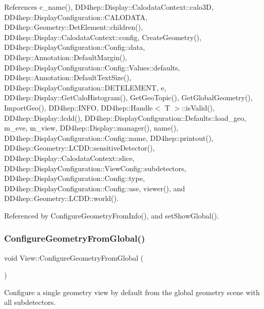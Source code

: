 References c\+\_\+name(), D\+D4hep\+::\+Display\+::\+Calodata\+Context\+::calo3D, D\+D4hep\+::\+Display\+Configuration\+::\+C\+A\+L\+O\+D\+A\+TA, D\+D4hep\+::\+Geometry\+::\+Det\+Element\+::children(), D\+D4hep\+::\+Display\+::\+Calodata\+Context\+::config, Create\+Geometry(), D\+D4hep\+::\+Display\+Configuration\+::\+Config\+::data, D\+D4hep\+::\+Annotation\+::\+Default\+Margin(), D\+D4hep\+::\+Display\+Configuration\+::\+Config\+::\+Values\+::defaults, D\+D4hep\+::\+Annotation\+::\+Default\+Text\+Size(), D\+D4hep\+::\+Display\+Configuration\+::\+D\+E\+T\+E\+L\+E\+M\+E\+NT, e, D\+D4hep\+::\+Display\+::\+Get\+Calo\+Histogram(), Get\+Geo\+Topic(), Get\+Global\+Geometry(), Import\+Geo(), D\+D4hep\+::\+I\+N\+FO, D\+D4hep\+::\+Handle$<$ T $>$\+::is\+Valid(), D\+D4hep\+::\+Display\+::lcdd(), D\+D4hep\+::\+Display\+Configuration\+::\+Defaults\+::load\+\_\+geo, m\+\_\+eve, m\+\_\+view, D\+D4hep\+::\+Display\+::manager(), name(), D\+D4hep\+::\+Display\+Configuration\+::\+Config\+::name, D\+D4hep\+::printout(), D\+D4hep\+::\+Geometry\+::\+L\+C\+D\+D\+::sensitive\+Detector(), D\+D4hep\+::\+Display\+::\+Calodata\+Context\+::slice, D\+D4hep\+::\+Display\+Configuration\+::\+View\+Config\+::subdetectors, D\+D4hep\+::\+Display\+Configuration\+::\+Config\+::type, D\+D4hep\+::\+Display\+Configuration\+::\+Config\+::use, viewer(), and D\+D4hep\+::\+Geometry\+::\+L\+C\+D\+D\+::world().



Referenced by Configure\+Geometry\+From\+Info(), and set\+Show\+Global().

\hypertarget{class_d_d4hep_1_1_view_a2bf3fea77f89710cbccb03dbf8398501}{}\label{class_d_d4hep_1_1_view_a2bf3fea77f89710cbccb03dbf8398501} 
\subsubsection{\texorpdfstring{Configure\+Geometry\+From\+Global()}{ConfigureGeometryFromGlobal()}}
{\footnotesize\ttfamily void View\+::\+Configure\+Geometry\+From\+Global (\begin{DoxyParamCaption}{ }\end{DoxyParamCaption})\hspace{0.3cm}{\ttfamily [virtual]}}



Configure a single geometry view by default from the global geometry scene with all subdetectors. 

